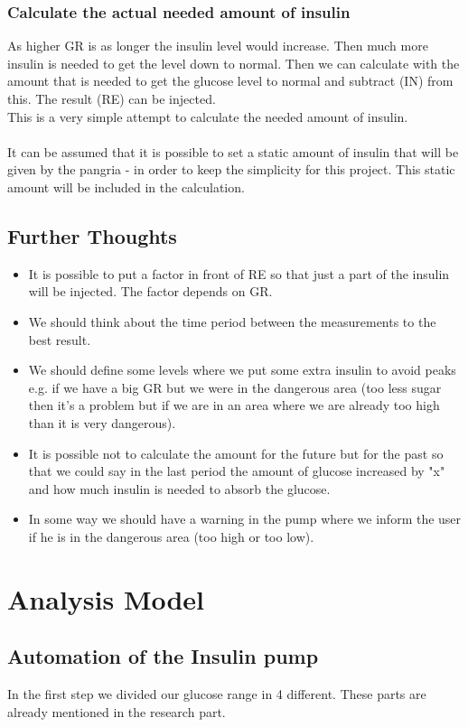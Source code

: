 \documentclass[pdflatex,a4paper,11pt,english]{scrreprt}
\begin{document}
\subsubsection{Calculate the actual needed amount of insulin}
As higher GR is as longer the insulin level would increase. Then much more
insulin is needed to get the level down to normal. Then we can calculate with
the amount that is needed to get the glucose level to normal and subtract (IN)
from this. The result (RE) can be injected. \\
This is a very simple attempt to calculate the needed amount of insulin. \\ \\
It can be assumed that it is possible to set a static amount of insulin
that will be given by the pangria - in order to keep the simplicity for this project. This static amount will be included in the calculation.

\subsection{Further Thoughts}
\begin{itemize}
  \item It is possible to put a factor in front of RE so that just a part of
  the insulin will be injected. The factor depends on GR.
  \item We should think about the time period between the measurements to the
  best result.
  \item We should define some levels where we put some extra insulin to avoid
  peaks e.g. if we have a big GR but we were in the dangerous area (too less
  sugar then it's a problem but if we are in an area where we are already too
  high than it is very dangerous).
  \item It is possible not to calculate the amount for the future but for the
  past so that we could say in the last period the amount of glucose increased by
  "x" and how much insulin is needed to absorb the glucose.
  \item In some way we should have a warning in the pump where we inform the
  user if he is in the dangerous area (too high or too low).
\end{itemize}

\section{Analysis Model}
\subsection{Automation of the Insulin pump}
In the first step we divided our glucose range in 4 different. These parts are already mentioned in the research part.
\end{document}
